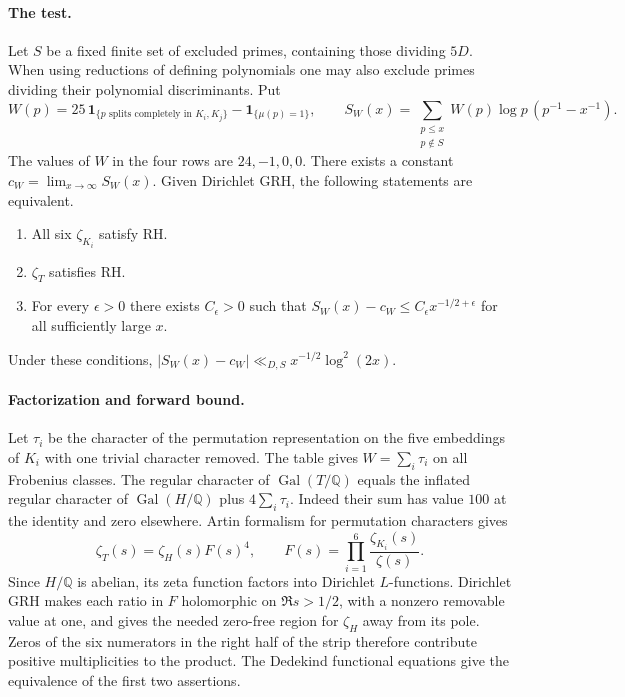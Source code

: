 \paragraph{The test.}
Let $S$ be a fixed finite set of excluded primes, containing those
dividing $5D$. When using reductions of defining polynomials one may
also exclude primes dividing their polynomial discriminants. Put
\[
 W(p)=25\,\mathbf1_{\{p\text{ splits completely in }K_i,K_j\}}
               -\mathbf1_{\{\mu(p)=1\}}, \qquad
 S_W(x)=\sum_{\substack{p\le x\\p\notin S}}
           W(p)\log p\,(p^{-1}-x^{-1}).
\]
The values of $W$ in the four rows are $24,-1,0,0$. There exists a
constant $c_W=\lim_{x\to\infty}S_W(x)$. Given Dirichlet GRH, the
following statements are equivalent.
\begin{enumerate}
\item All six $\zeta_{K_i}$ satisfy RH.
\item $\zeta_T$ satisfies RH.
\item For every $\epsilon>0$ there exists $C_\epsilon>0$ such that
$S_W(x)-c_W\le C_\epsilon x^{-1/2+\epsilon}$ for all sufficiently large $x$.
\end{enumerate}
Under these conditions, $|S_W(x)-c_W|\ll_{D,S} x^{-1/2}\log^2(2x)$.

\paragraph{Factorization and forward bound.}
Let $\tau_i$ be the character of the permutation representation on
the five embeddings of $K_i$ with one trivial character removed.
The table gives $W=\sum_i\tau_i$ on all Frobenius classes.
The regular character of $\operatorname{Gal}(T/\mathbb Q)$ equals the
inflated regular character of $\operatorname{Gal}(H/\mathbb Q)$ plus
$4\sum_i\tau_i$. Indeed their sum has value $100$ at the identity and
zero elsewhere. Artin formalism for permutation characters gives
\[
 \zeta_T(s)=\zeta_H(s)F(s)^4,\qquad
 F(s)=\prod_{i=1}^{6}\frac{\zeta_{K_i}(s)}{\zeta(s)}.
\]
Since $H/\mathbb Q$ is abelian, its zeta function factors into Dirichlet
$L$-functions. Dirichlet GRH makes each ratio in $F$ holomorphic on
$\Re s>1/2$, with a nonzero removable value at one, and gives the needed
zero-free region for $\zeta_H$ away from its pole. Zeros of the six
numerators in the right half of the strip therefore contribute positive
multiplicities to the product. The Dedekind functional equations give
the equivalence of the first two assertions.

